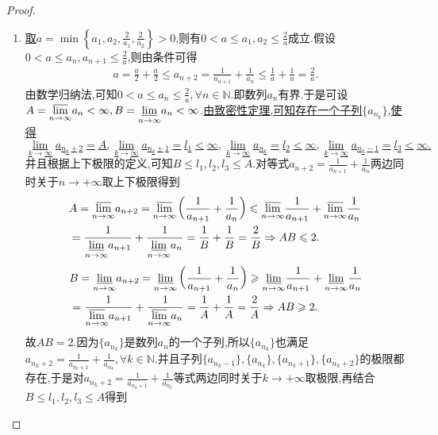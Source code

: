 \documentclass[../../main.tex]{subfiles}
\begin{document}
\begin{proof}
\begin{enumerate}
\item \hyperref[example3.24(1)]{取\(a=\min \left\{ a_1,a_2,\frac{2}{a_1},\frac{2}{a_2} \right\}>0\)},则有$0<a\leqslant  a_1,a_2\leqslant  \frac{2}{a}$成立.假设$0<a\leqslant  a_n,a_{n+1}\leqslant  \frac{2}{a}$,则由条件可得
\begin{align*}
a=\frac{a}{2}+\frac{a}{2}\leqslant a_{n+2}=\frac{1}{a_{n+1}}+\frac{1}{a_n}\leqslant \frac{1}{a}+\frac{1}{a}=\frac{2}{a}.
\end{align*}
由数学归纳法,可知$0<a\leqslant  a_n\leqslant  \frac{2}{a},\forall n\in\mathbb{N}$.即数列${a_n}$有界.于是可设$A=\underset{n\rightarrow \infty}{{\varlimsup }}a_n<\infty ,B=\underset{n\rightarrow \infty}{{\varliminf }}a_n<\infty$.\hyperref[example3.24(2)]{由致密性定理,可知存在一个子列$\{a_{n_k}\}$,使得$$\lim_{k\rightarrow \infty} a_{n_k+2}=A,\lim_{k\rightarrow \infty} a_{n_k+1}=l_1<\infty,\lim_{k\rightarrow \infty} a_{n_k}=l_2<\infty,\lim_{k\rightarrow \infty} a_{n_k-1}=l_3<\infty.$$}并且根据上下极限的定义,可知$B\leqslant  l_1,l_2,l_3\leqslant  A$.对等式$a_{n + 2} = \frac{1}{a_{n + 1}} + \frac{1}{a_{n}}$两边同时关于$n\to+\infty$取上下极限得到
\begin{align*}
&A=\underset{n\rightarrow \infty}{{\varlimsup }}a_{n+2}=\underset{n\rightarrow \infty}{{\varlimsup }}\left( \frac{1}{a_{n+1}}+\frac{1}{a_n} \right) \leqslant \underset{n\rightarrow \infty}{{\varlimsup }}\frac{1}{a_{n+1}}+\underset{n\rightarrow \infty}{{\varlimsup }}\frac{1}{a_n}
\\
&=\frac{1}{\underset{n\rightarrow \infty}{{\varliminf }}a_{n+1}}+\frac{1}{\underset{n\rightarrow \infty}{{\varliminf }}a_n}=\frac{1}{B}+\frac{1}{B}=\frac{2}{B}\Rightarrow AB\leqslant 2.
\end{align*}
\begin{align*}
&B=\underset{n\rightarrow \infty}{{\varliminf }}a_{n+2}=\underset{n\rightarrow \infty}{{\varliminf }}\left( \frac{1}{a_{n+1}}+\frac{1}{a_n} \right) \geqslant \underset{n\rightarrow \infty}{{\varliminf }}\frac{1}{a_{n+1}}+\underset{n\rightarrow \infty}{{\varliminf }}\frac{1}{a_n}
\\
&=\frac{1}{\underset{n\rightarrow \infty}{{\varlimsup }}a_{n+1}}+\frac{1}{\underset{n\rightarrow \infty}{{\varlimsup }}a_n}=\frac{1}{A}+\frac{1}{A}=\frac{2}{A}\Rightarrow AB\geqslant 2.
\end{align*}
故$AB=2$.因为$\{a_{n_k}\}$是数列${a_n}$的一个子列,所以$\{a_{n_k}\}$也满足$a_{n_k+2}=\frac{1}{a_{n_k+1}}+\frac{1}{a_{n_k}},\forall k\in\mathbb{N}$.并且子列$\{a_{n_k-1}\},\{a_{n_k}\},\{a_{n_k+1}\},\{a_{n_k+2}\}$的极限都存在,于是对$a_{n_k+2}=\frac{1}{a_{n_k+1}}+\frac{1}{a_{n_k}}$等式两边同时关于$k\to+\infty$取极限,再结合$B\leqslant  l_1,l_2,l_3\leqslant  A$得到

\end{enumerate}
\end{proof}
\end{document}
